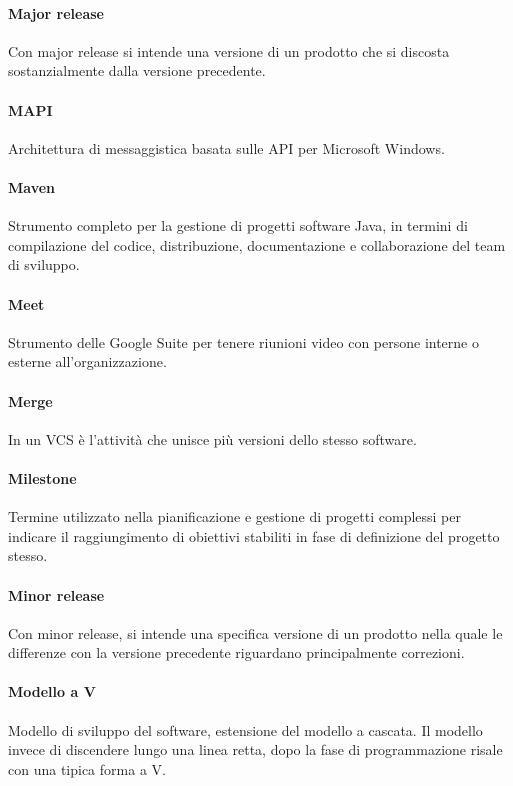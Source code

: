 \documentclass[]{article}
\begin{document}
	\paragraph*{Major release}
	Con major release si intende una versione di un prodotto che si discosta sostanzialmente dalla versione precedente.

	\paragraph*{MAPI}
	Architettura di messaggistica basata sulle API per Microsoft Windows.

	\paragraph*{Maven}
	Strumento completo per la gestione di progetti software Java, in termini di compilazione del codice, distribuzione, documentazione e collaborazione del team di sviluppo.

	\paragraph*{Meet}
	Strumento delle Google Suite per tenere riunioni video con persone interne o esterne all'organizzazione.

	\paragraph*{Merge}
	In un VCS è l'attività che unisce più versioni dello stesso software.

	\paragraph*{Milestone}
	Termine utilizzato nella pianificazione e gestione di progetti complessi per indicare il raggiungimento di obiettivi stabiliti in fase di definizione del progetto stesso.

	\paragraph*{Minor release}
	Con minor release, si intende una specifica versione di un prodotto nella quale le differenze con la versione precedente riguardano principalmente correzioni.

	\paragraph*{Modello a V}
	Modello di sviluppo del software, estensione del modello a cascata. Il modello invece di discendere lungo una linea retta, dopo la fase di programmazione risale con una tipica forma a V.
	
\end{document}

